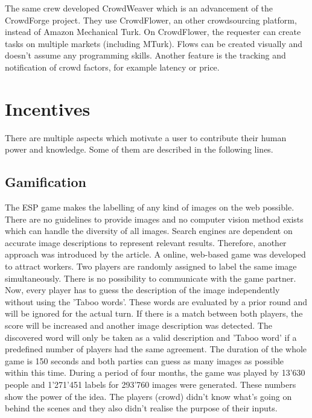 The same crew developed CrowdWeaver\cite{crowdweaver} which is an advancement of the CrowdForge project. They use CrowdFlower, an other crowdsourcing platform, instead of Amazon Mechanical Turk. On CrowdFlower, the requester can create tasks on multiple markets (including MTurk). Flows can be created visually and doesn't assume any programming skills. Another feature is the tracking and notification of crowd factors, for example latency or price.

\section{Incentives}
There are multiple aspects which motivate a user to contribute their human power and knowledge. Some of them are described in the following lines.
\subsection{Gamification}
The ESP game\cite{esp} makes the labelling of any kind of images on the web possible. There are no guidelines to provide images and no computer vision method exists which can handle the diversity of all images. Search engines are dependent on accurate image descriptions to represent relevant results. Therefore, another approach was introduced by the article. A online, web-based game was developed to attract workers. Two players are randomly assigned to label the same image simultaneously. There is no possibility to communicate with the game partner. Now, every player has to guess the description of the image independently without using the 'Taboo words'. These words are evaluated by a prior round and will be ignored for the actual turn. If there is a match between both players, the score will be increased and another image description was detected. The discovered word will only be taken as a valid description and 'Taboo word' if a predefined number of players had the same agreement. The duration of the whole game is 150 seconds and both parties can guess as many images as possible within this time. 
During a period of four months, the game was played by 13'630 people and 1'271'451 labels for 293'760 images were generated. These numbers show the power of the idea. The players (crowd) didn't know what's going on behind the scenes and they also didn't realise the purpose of their inputs.

